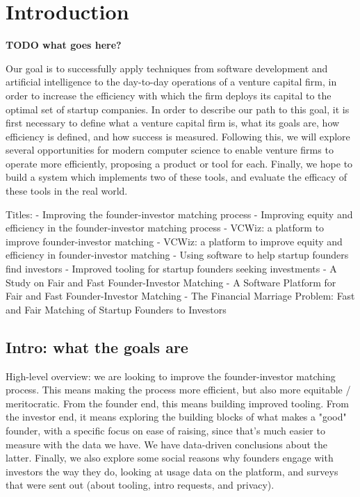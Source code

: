 \chapter{Introduction}

\textbf{TODO what goes here?}

Our goal is to successfully apply techniques from software development and artificial intelligence to the day-to-day operations of a venture capital firm, in order to increase the efficiency with which the firm deploys its capital to the optimal set of startup companies. In order to describe our path to this goal, it is first necessary to define what a venture capital firm is, what its goals are, how efficiency is defined, and how success is measured. Following this, we will explore several opportunities for modern computer science to enable venture firms to operate more efficiently, proposing a product or tool for each. Finally, we hope to build a system which implements two of these tools, and evaluate the efficacy of these tools in the real world.


Titles:
  - Improving the founder-investor matching process
  - Improving equity and efficiency in the founder-investor matching process
  - VCWiz: a platform to improve founder-investor matching
  - VCWiz: a platform to improve equity and efficiency in founder-investor matching
  - Using software to help startup founders find investors
  - Improved tooling for startup founders seeking investments
  - A Study on Fair and Fast Founder-Investor Matching
  - A Software Platform for Fair and Fast Founder-Investor Matching
  - The Financial Marriage Problem: Fast and Fair Matching of Startup Founders to Investors

\section{Intro: what the goals are}

High-level overview: we are looking to improve the founder-investor matching process. This means making the process more efficient, but also more equitable / meritocratic. From the founder end, this means building improved tooling. From the investor end, it means exploring the building blocks of what makes a "good" founder, with a specific focus on ease of raising, since that's much easier to measure with the data we have. We have data-driven conclusions about the latter. Finally, we also explore some social reasons why founders engage with investors the way they do, looking at usage data on the platform, and surveys that were sent out (about tooling, intro requests, and privacy).

